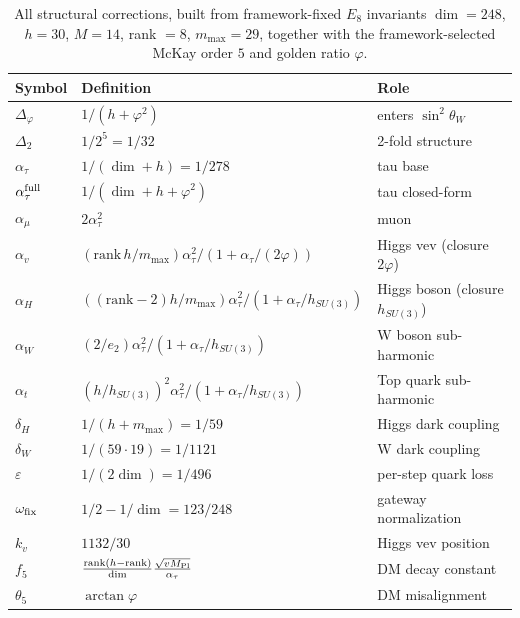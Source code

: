 ﻿\documentclass[reprint,amsmath,amssymb,aps,prd,longbibliography,floatfix]{revtex4-2}
\begin{document}
\begin{table}[t]
\centering
\caption{All structural corrections, built from framework-fixed
$E_8$ invariants $\dim = 248$, $h = 30$, $M = 14$, rank $= 8$,
$m_{\max} = 29$, together with the framework-selected McKay order $5$
and golden ratio $\varphi$.}
\begin{tabular}{lll}
\toprule
Symbol & Definition & Role \\
\midrule
$\Delta_\varphi$       & $1/(h + \varphi^2)$              & enters $\sin^2\theta_W$ \\
$\Delta_2$             & $1/2^5 = 1/32$                   & 2-fold structure \\
$\alpha_\tau$          & $1/(\dim + h) = 1/278$           & tau base \\
$\alpha_\tau^{\rm full}$ & $1/(\dim + h + \varphi^2)$    & tau closed-form \\
$\alpha_\mu$           & $2 \alpha_\tau^2$                & muon \\
$\alpha_v$             & $(\text{rank}\,h/m_{\max})\alpha_\tau^2/(1+\alpha_\tau/(2\varphi))$ & Higgs vev (closure $2\varphi$) \\
$\alpha_H$             & $((\text{rank}-2)h/m_{\max})\alpha_\tau^2/(1+\alpha_\tau/h_{SU(3)})$ & Higgs boson (closure $h_{SU(3)}$) \\
$\alpha_W$             & $(2/e_2)\alpha_\tau^2/(1+\alpha_\tau/h_{SU(3)})$ & W boson sub-harmonic \\
$\alpha_t$             & $(h/h_{SU(3)})^2 \alpha_\tau^2/(1+\alpha_\tau/h_{SU(3)})$ & Top quark sub-harmonic \\
$\delta_H$             & $1/(h + m_{\max}) = 1/59$        & Higgs dark coupling \\
$\delta_W$             & $1/(59 \cdot 19) = 1/1121$       & W dark coupling \\
$\varepsilon$          & $1/(2\dim) = 1/496$              & per-step quark loss \\
$\omega_{\rm fix}$     & $1/2 - 1/\dim = 123/248$         & gateway normalization \\
$k_v$                  & $1132/30$                        & Higgs vev position \\
$f_5$                  & $\frac{\text{rank}(h-\text{rank})}{\dim} \frac{\sqrt{v M_{\rm Pl}}}{\alpha_\tau}$ & DM decay constant \\
$\theta_5$             & $\arctan \varphi$                & DM misalignment \\
\bottomrule
\end{tabular}
\end{table}
\end{document}
